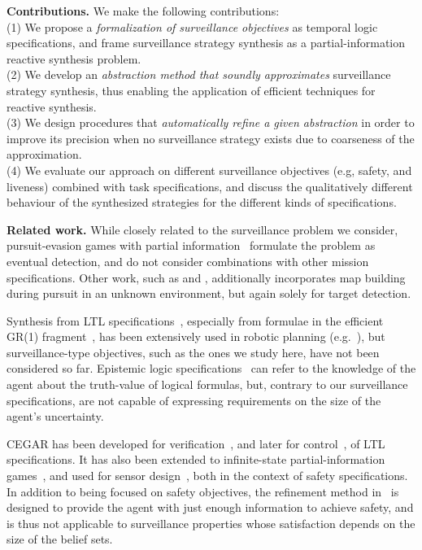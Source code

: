 {\bf Contributions.} We make the following contributions:\\
(1) We propose a \emph{formalization of surveillance objectives} as temporal logic specifications, and frame surveillance strategy synthesis  as a partial-information reactive synthesis problem.\\
(2) We develop an \emph{abstraction method that soundly approximates} surveillance strategy synthesis, thus enabling the application of efficient techniques for reactive synthesis.\\
(3) We design procedures that \emph{automatically refine a given abstraction} in order to improve its precision when no surveillance strategy exists due to coarseness of the approximation.\\
(4) We evaluate our approach on different surveillance objectives (e.g, safety, and liveness) combined with task specifications, and discuss the qualitatively different behaviour of the synthesized strategies for the different kinds of specifications.

{\bf Related work.}
While closely related to the surveillance problem we consider, pursuit-evasion games with partial information~\cite{Chung2011, Chin2010, Antoniades2003} formulate the problem as eventual detection, and do not consider combinations with other mission specifications. Other work, such as \cite{Vidal2002} and \cite{Kim2001}, additionally incorporates map building during pursuit in an unknown environment, but again solely for target detection.

Synthesis from LTL specifications~\cite{Pnueli1989}, especially from formulae in the efficient GR(1) fragment~\cite{Piterman2006}, has been extensively used in robotic planning (e.g.~\cite{wong2012,Kress2007}), but surveillance-type objectives, such as the ones we study here, have not been considered so far. Epistemic logic specifications~\cite{MeydenV98} can refer to the knowledge of the agent about the truth-value of logical formulas, but, contrary to our surveillance specifications, are not capable of expressing requirements on the size of the agent's uncertainty.

CEGAR has been developed for verification~\cite{ClarkeGJLV00}, and later for control~\cite{HenzingerJM03}, of LTL specifications. 
It has also been extended to infinite-state partial-information games~\cite{DimitrovaF08}, and used for sensor design~\cite{FuDT14}, both in the context of safety specifications. In addition to being focused on safety objectives, the refinement method in~\cite{DimitrovaF08} is designed to provide the agent with just enough information to achieve safety, and is thus not applicable to surveillance properties whose satisfaction depends on the size of the belief sets.

